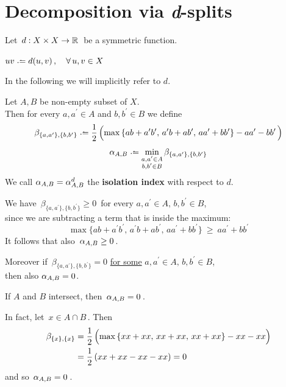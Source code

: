 \documentclass[./main.tex]{subfiles}
\begin{document}
\ifSubfilesClassLoaded{\mainmatter}{}

\chapter{Decomposition via \textit{d}-splits} \label{chap:p2c2}

Let $\, d : {X \times X} \to \mathbb{R} \,$ be a symmetric function.

\begin{notation}
    $uv \defeq d(u,v) \,, \quad \forall\, u,v \in X$
\end{notation}
In the following we will implicitly refer to $d$.

\begin{definition}
    Let $A,B$ be non-empty subset of $X$. \\
    Then for every $a,a^\prime \in A$ and $b,b^\prime \in B$ we define
    \[ \beta_{\{a,a^\prime\},\{b,b^\prime\}} \defeq \frac{1}{2}\, \Bigl( \max {\{ ab + a^\prime b^\prime,\, a^\prime b + ab^\prime,\, aa^\prime + bb^\prime \}} - aa^\prime - bb^\prime \,\Bigr) \]
    \[ \aAB \defeq \min_{\substack{a,a^\prime \in A \\ b,b^\prime \in B}}{\beta_{\{a,a^\prime\},\{b,b^\prime\}}} \]
    We call $\alpha_{A,B} = \alpha_{A,B}^d$ the \textbf{isolation index} with respect to $d$.
\end{definition}

\begin{remark}
    We have $\, \beta_{\{a,a^\prime\},\{b,b^\prime\}} \geq 0 \,$ for every $a,a^\prime \in A,\, b,b^\prime \in B$, \\[2pt]
    \bsp since we are subtracting a term that is inside the maximum:
    \[ \max {\{ ab + a^\prime b^\prime,\, a^\prime b + ab^\prime,\, aa^\prime + bb^\prime \}}\ \geq\ aa^\prime + bb^\prime \]
    It follows that also $\, \alpha_{A,B} \geq 0 \,$.
    
    Moreover if $\, \beta_{\{a,a^\prime\},\{b,b^\prime\}} = 0$ \underline{for some} $a,a^\prime \in A,\, b,b^\prime \in B$, \\[2pt]
    \bsp then also $\alpha_{A,B} = 0$.
\end{remark}

\clearpage

\begin{remark}
    If $A$ and $B$ intersect, then $\, \alpha_{A,B} = 0 \,$.
    
    In fact, let $\, x \in A \cap B \,$. Then
    \begin{align*}
        \beta_{\{x\},\{x\}} &= \frac{1}{2}\, \Bigl( \max {\{ xx + xx,\, xx + xx,\, xx + xx \}} - xx - xx \Bigr) \\
        &= \frac{1}{2}\, (xx + xx - xx - xx) = 0
    \end{align*}
    and so $\, \alpha_{A,B} = 0 \,$.
\end{remark}
\end{document}
